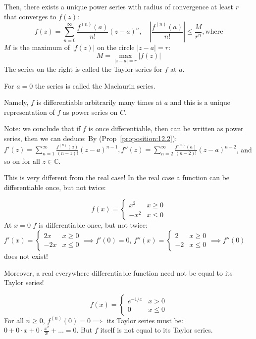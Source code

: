 Then, there exists a unique power series with radius of convergence at least $r$ that converges to $f(z)$:
\[ f(z) = \sum_{n=0}^{\infty} \frac{f^{(n)}(a)}{n!}(z-a)^n, \quad \left| \frac{f^{(n)}(a)}{n!} \right| \leq \frac{M}{r^n}, \text{where} \]
$M$ is the maximum of $|f(z)|$ on the circle $|z-a| = r$:
\[ M = \max_{|z-a|=r} |f(z)| \]
The series on the right is called the Taylor series for $f$ at $a$.

\begin{remark}
    For $a = 0$ the series is called the Maclaurin series.
\end{remark}

Namely, $f$ is differentiable arbitrarily many times at $a$ and this is a unique representation of $f$ as power series on $C$.

Note: we conclude that if $f$ is once differentiable, then can be written as power series, then we can deduce: By (Prop~\ref{proposition:12.2}): $f'(z) = \sum_{n=1}^{\infty} \frac{f^{(n)}(a)}{(n-1)!}(z-a)^{n-1}, f''(z) = \sum_{n=2}^{\infty} \frac{f^{(n)}(a)}{(n-2)!}(z-a)^{n-2}$, and so on for all $z \in \mathbb{C}$.

\begin{remark}
    This is very different from the real case! In the real case a function can be differentiable once, but not twice:
\end{remark}

\begin{example}\label{example:15.4}
\[
 f(x) = \begin{cases}
x^2 & x \geq 0 \\
-x^2 & x \leq 0
\end{cases} 
\]
At $x = 0$ $f$ is differentiable once, but not twice: $f'(x) = \begin{cases} 2x & x \geq 0 \\ -2x & x \leq 0 \end{cases} \implies f'(0) = 0$, $f''(x) = \begin{cases} 2 & x \geq 0 \\ -2 & x \leq 0 \end{cases} \implies f''(0)$ does not exist!
\end{example}

Moreover, a real everywhere differentiable function need not be equal to its Taylor series!

\begin{example}\label{example:15.5}
    \[ f(x) = \begin{cases}
e^{-1/x} & x > 0 \\
0 & x \leq 0
\end{cases} \]
For all $n \geq 0$, $f^{(n)}(0) = 0 \implies$ its Taylor series must be: $0 + 0 \cdot x + 0 \cdot \frac{x^2}{2!} + \dots = 0$. But $f$ itself is not equal to its Taylor series.
\end{example}


